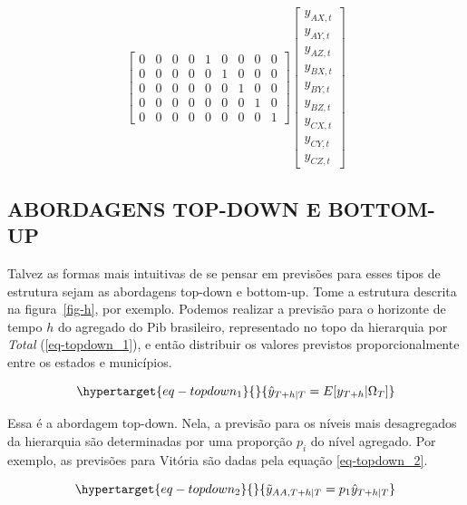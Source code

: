 \documentclass[
  12pt,
  letterpaper,
  DIV=11,
  numbers=noendperiod]{scrartcl}
\begin{document}
\begin{equation}
{\begin{bmatrix}
    0 & 0 & 0 & 0 & 1 & 0 & 0 & 0 & 0 \\
    0 & 0 & 0 & 0 & 0 & 1 & 0 & 0 & 0 \\
    0 & 0 & 0 & 0 & 0 & 0 & 1 & 0 & 0 \\
    0 & 0 & 0 & 0 & 0 & 0 & 0 & 1 & 0 \\
    0 & 0 & 0 & 0 & 0 & 0 & 0 & 0 & 1
\end{bmatrix}
\begin{bmatrix}
    y_{AX, t} \\
    y_{AY, t} \\
    y_{AZ, t} \\
    y_{BX, t} \\
    y_{BY, t} \\
    y_{BZ, t} \\
    y_{CX, t} \\
    y_{CY, t} \\
    y_{CZ, t}
\end{bmatrix}
}\label{eq-matriz_ha}\end{equation}

\hypertarget{abordagens-top-down-e-bottom-up}{%
\subsection*{ABORDAGENS TOP-DOWN E
BOTTOM-UP}\label{abordagens-top-down-e-bottom-up}}

Talvez as formas mais intuitivas de se pensar em previsões para esses
tipos de estrutura sejam as abordagens top-down e bottom-up. Tome a
estrutura descrita na figura~\ref{fig-h}, por exemplo. Podemos realizar
a previsão para o horizonte de tempo \(h\) do agregado do Pib
brasileiro, representado no topo da hierarquia por \emph{Total}
(\ref{eq-topdown_1}), e então distribuir os valores previstos
proporcionalmente entre os estados e municípios.

\begin{equation}\protect\hypertarget{eq-topdown_1}{}{
\hat{y}_{T+h | T} = E[y_{T+h} | \Omega_T]
}\label{eq-topdown_1}\end{equation}

Essa é a abordagem top-down. Nela, a previsão para os níveis mais
desagregados da hierarquia são determinadas por uma proporção \(p_i\) do
nível agregado. Por exemplo, as previsões para Vitória são dadas pela
equação \ref{eq-topdown_2}.

\begin{equation}\protect\hypertarget{eq-topdown_2}{}{
\tilde{y}_{AA, T+h | T} = p_{1}\hat{y}_{T+h | T}
}\label{eq-topdown_2}\end{equation}
\end{document}
